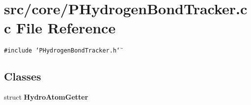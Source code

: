 \section{src/core/PHydrogen\-Bond\-Tracker.cc File Reference}
\label{PHydrogenBondTracker_8cc}


{\tt \#include \char`\"{}PHydrogen\-Bond\-Tracker.h\char`\"{}}\par
\subsection*{Classes}
\begin{CompactItemize}
\item 
struct {\bf Hydro\-Atom\-Getter}
\end{CompactItemize}
